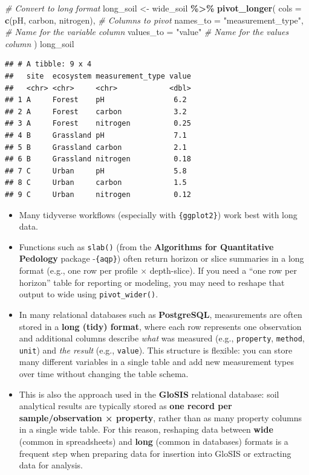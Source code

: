 \documentclass[
  10pt,
  b5paper,
  oneside]{book}
\newenvironment{Shaded}{\begin{snugshade}}{\end{snugshade}}
\newcommand{\AttributeTok}[1]{\textcolor[rgb]{0.13,0.29,0.53}{#1}}
\newcommand{\CommentTok}[1]{\textcolor[rgb]{0.56,0.35,0.01}{\textit{#1}}}
\newcommand{\FunctionTok}[1]{\textcolor[rgb]{0.13,0.29,0.53}{\textbf{#1}}}
\newcommand{\NormalTok}[1]{#1}
\newcommand{\OtherTok}[1]{\textcolor[rgb]{0.56,0.35,0.01}{#1}}
\newcommand{\SpecialCharTok}[1]{\textcolor[rgb]{0.81,0.36,0.00}{\textbf{#1}}}
\newcommand{\StringTok}[1]{\textcolor[rgb]{0.31,0.60,0.02}{#1}}
\begin{document}
\begin{Shaded}
\begin{Highlighting}[]
\CommentTok{\# Convert to long format}
\NormalTok{long\_soil }\OtherTok{\textless{}{-}}\NormalTok{ wide\_soil }\SpecialCharTok{\%\textgreater{}\%}
 \FunctionTok{pivot\_longer}\NormalTok{(}
  \AttributeTok{cols =} \FunctionTok{c}\NormalTok{(pH, carbon, nitrogen),     }\CommentTok{\# Columns to pivot}
  \AttributeTok{names\_to =} \StringTok{"measurement\_type"}\NormalTok{,      }\CommentTok{\# Name for the variable column}
  \AttributeTok{values\_to =} \StringTok{"value"}           \CommentTok{\# Name for the values column}
\NormalTok{ )}
\NormalTok{long\_soil}
\end{Highlighting}
\end{Shaded}

\begin{verbatim}
## # A tibble: 9 x 4
##   site  ecosystem measurement_type value
##   <chr> <chr>     <chr>            <dbl>
## 1 A     Forest    pH                6.2 
## 2 A     Forest    carbon            3.2 
## 3 A     Forest    nitrogen          0.25
## 4 B     Grassland pH                7.1 
## 5 B     Grassland carbon            2.1 
## 6 B     Grassland nitrogen          0.18
## 7 C     Urban     pH                5.8 
## 8 C     Urban     carbon            1.5 
## 9 C     Urban     nitrogen          0.12
\end{verbatim}

\begin{itemize}
\item
  Many tidyverse workflows (especially with \texttt{\{ggplot2\}}) work best with long data.
\item
  Functions such as \texttt{slab()} (from the \textbf{Algorithms for Quantitative Pedology} package -\texttt{\{aqp\}}) often return horizon or slice summaries in a long format (e.g., one row per profile × depth-slice). If you need a ``one row per horizon'' table for reporting or modeling, you may need to reshape that output to wide using \texttt{pivot\_wider()}.
\item
  In many relational databases such as \textbf{PostgreSQL}, measurements are often stored in a \textbf{long (tidy) format}, where each row represents one observation and additional columns describe \emph{what} was measured (e.g., \texttt{property}, \texttt{method}, \texttt{unit}) and \emph{the result} (e.g., \texttt{value}). This structure is flexible: you can store many different variables in a single table and add new measurement types over time without changing the table schema.
\item
  This is also the approach used in the \textbf{GloSIS} relational database: soil analytical results are typically stored as \textbf{one record per sample/observation × property}, rather than as many property columns in a single wide table. For this reason, reshaping data between \textbf{wide} (common in spreadsheets) and \textbf{long} (common in databases) formats is a frequent step when preparing data for insertion into GloSIS or extracting data for analysis.
\end{itemize}
\end{document}
